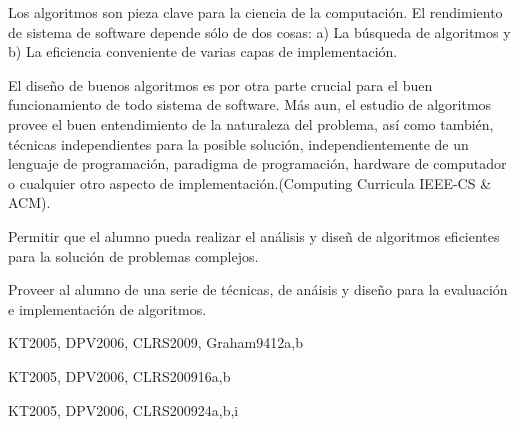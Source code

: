 \begin{syllabus}


\begin{justification}
Los algoritmos son pieza clave para la ciencia de la computación. 
El rendimiento de sistema de software
depende sólo de dos cosas: a) La búsqueda de  algoritmos y b) La
eficiencia conveniente de varias capas de implementación.

El diseño de buenos algoritmos es por otra parte crucial para el
buen funcionamiento de todo sistema de software. Más aun, el
estudio  de algoritmos provee el buen entendimiento de la
naturaleza  del problema, así como también, técnicas
independientes para la posible solución, independientemente de un
lenguaje de programación, paradigma de programación, hardware de
computador o cualquier otro aspecto de implementación.(Computing
Curricula IEEE-CS \& ACM).
\end{justification}

\begin{goals}
 \item Permitir que el alumno pueda realizar el análisis y diseñ
de algoritmos eficientes para la solución de problemas complejos.

 \item Proveer al alumno de una serie de técnicas, de anáisis y
diseño para la evaluación e implementación de algoritmos.
\end{goals}

\begin{outcomes}
\end{outcomes}

\begin{unit}{\ALBasicAnalysisDef}{}{KT2005, DPV2006, CLRS2009, Graham94}{12}{a,b}
    \ALBasicAnalysisAllTopics
    \ALBasicAnalysisAllObjectives
\end{unit}

\begin{unit}{\ALFundamentalAlgorithmsDef}{}{KT2005, DPV2006, CLRS2009}{16}{a,b}
    \ALFundamentalAlgorithmsAllTopics
    \ALFundamentalAlgorithmsAllObjectives
\end{unit}

\begin{unit}{\ALAlgoritmicStrategiesDef}{}{KT2005, DPV2006, CLRS2009}{24}{a,b,i}
   \ALAlgoritmicStrategiesAllTopics
   \ALAlgoritmicStrategiesAllObjectives
\end{unit}


\end{syllabus}
